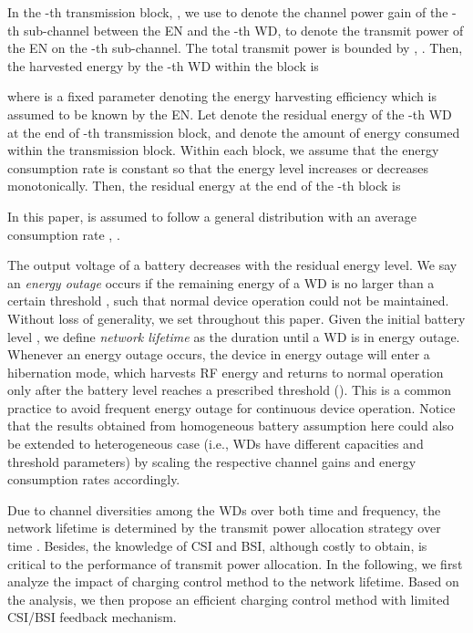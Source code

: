 \documentclass[conference]{IEEEtran}
\begin{document}
In the -th transmission block, , we use  to denote the channel power gain of the -th sub-channel between the EN and the -th WD,  to denote the transmit power of the EN on the -th sub-channel. The total transmit power is bounded by , . Then, the harvested energy by the -th WD within the block is \cite{2013:Zhou}

where  is a fixed parameter denoting the energy harvesting efficiency which is assumed to be known by the EN. Let  denote the residual energy of the -th WD at the end of -th transmission block, and  denote the amount of energy consumed within the transmission block. Within each block, we assume that the energy consumption rate is constant so that the energy level increases or decreases monotonically. Then, the residual energy at the end of the -th block is

In this paper,  is assumed to follow a general distribution with an average consumption rate , .

The output voltage of a battery decreases with the residual energy level. We say an \emph{energy outage} occurs if the remaining energy of a WD  is no larger than a certain threshold , such that normal device operation could not be maintained. Without loss of generality, we set  throughout this paper. Given the initial battery level , we define \emph{network lifetime} as the duration until a WD is in energy outage. Whenever an energy outage occurs, the device in energy outage will enter a hibernation mode, which harvests RF energy and returns to normal operation only after the battery level reaches a prescribed threshold  (). This is a common practice to avoid frequent energy outage for continuous device operation. Notice that the results obtained from homogeneous battery assumption here could also be extended to heterogeneous case (i.e., WDs have different capacities and threshold parameters) by scaling the respective channel gains and energy consumption rates accordingly.

Due to channel diversities among the WDs over both time and frequency, the network lifetime is determined by the transmit power allocation strategy  over time . Besides, the knowledge of CSI and BSI, although costly to obtain, is critical to the performance of transmit power allocation. In the following, we first analyze the impact of charging control method to the network lifetime. Based on the analysis, we then propose an efficient charging control method with limited CSI/BSI feedback mechanism.
\end{document}
